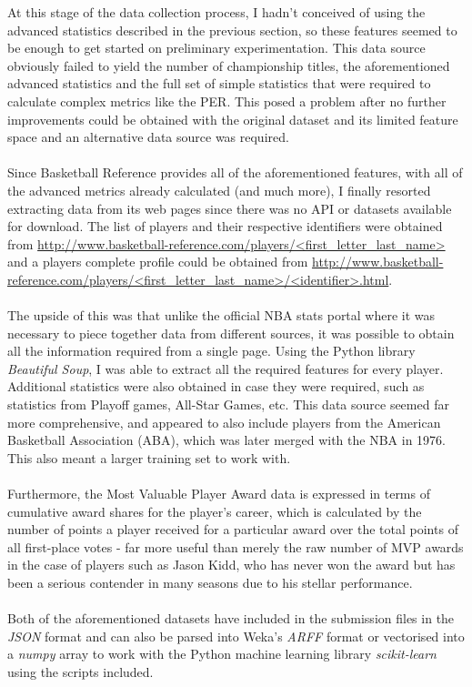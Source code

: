\documentclass[paper=a4, fontsize=11pt]{scrartcl} %
\numberwithin{equation}{section} %
\numberwithin{figure}{section} %
\numberwithin{table}{section} %
\begin{document}
At this stage of the data collection process, I hadn't conceived of using the advanced statistics described in the previous section, so these features seemed to be enough to get started on preliminary experimentation. This data source obviously failed to yield the number of championship titles, the aforementioned advanced statistics and the full set of simple statistics that were required to calculate complex metrics like the PER. This posed a problem after no further improvements could be obtained with the original dataset and its limited feature space and an alternative data source was required.\\
\\
Since Basketball Reference provides all of the aforementioned features, with all of the advanced metrics already calculated (and much more), I finally resorted extracting data from its web pages since there was no API or datasets available for download. The list of players and their respective identifiers were obtained from \url{http://www.basketball-reference.com/players/<first_letter_last_name>} and a players complete profile could be obtained from \url{http://www.basketball-reference.com/players/<first_letter_last_name>/<identifier>.html}.\\
\\
The upside of this was that unlike the official NBA stats portal where it was necessary to piece together data from different sources, it was possible to obtain all the information required from a single page. Using the Python library \textit{Beautiful Soup}, I was able to extract all the required features for every player. Additional statistics were also obtained in case they were required, such as statistics from Playoff games, All-Star Games, etc. This data source seemed far more comprehensive, and appeared to also include players from the American Basketball Association (ABA), which was later merged with the NBA in 1976. This also meant a larger training set to work with.\\
\\
Furthermore, the Most Valuable Player Award data is expressed in terms of cumulative award shares for the player's career, which is calculated by the number of points a player received for a particular award over the total points of all first-place votes\cite{mvp} - far more useful than merely the raw number of MVP awards in the case of players such as Jason Kidd, who has never won the award but has been a serious contender in many seasons due to his stellar performance.\\
\\
Both of the aforementioned datasets have included in the submission files in the \textit{JSON} format and can also be parsed into Weka's \textit{ARFF} format or vectorised into a \textit{numpy} array to work with the Python machine learning library \textit{scikit-learn} using the scripts included.
\end{document}
